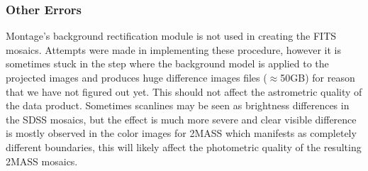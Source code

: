 \documentclass[5p]{elsarticle}
\begin{document}
	 	\subsubsection{Other Errors}
	 		Montage's background rectification module is not used in creating the FITS mosaics. Attempts were made in implementing these procedure, however it  is sometimes stuck in the step where the background model is applied to the projected images and  produces huge difference images files ($\approx$50GB) for reason that we have not figured out yet. This should not affect the astrometric quality of the data product. Sometimes scanlines may be seen as brightness differences in the SDSS mosaics, but the effect is much more severe and clear visible difference is  mostly  observed in the color images for 2MASS which manifests as completely different boundaries, this  will likely affect the photometric quality of the resulting 2MASS mosaics.
\end{document}
